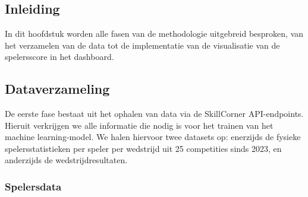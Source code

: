 \chapter{}%
\label{ch:proof-of-concept}

\section{Inleiding}

In dit hoofdstuk worden alle fasen van de methodologie uitgebreid besproken, van het verzamelen van de data tot de implementatie van de visualisatie van de spelersscore in het dashboard.

\section{Dataverzameling}

De eerste fase bestaat uit het ophalen van data via de SkillCorner API-endpoints. Hieruit verkrijgen we alle informatie die nodig is voor het trainen van het machine learning-model. We halen hiervoor twee datasets op: enerzijds de fysieke spelersstatistieken per speler per wedstrijd uit 25 competities sinds 2023, en anderzijds de wedstrijdresultaten.
\subsection{Spelersdata}

